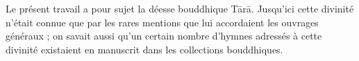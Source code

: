 \documentclass[a4paper, 11pt, oneside, french, landscape, twocolumn]{article}
\begin{document}
\setlength{\parskip}{1mm plus1mm minus1mm}
\clearpage
{}
\onecolumn
\tableofcontents
\clearpage
\twocolumn
{}
\section*{}
\paragraph{}
Le présent travail a pour sujet la déesse bouddhique T\={a}r\={a}. Jusqu'ici cette divinité n'était connue que par les rares mentions que lui accordaient les ouvrages généraux ; on savait aussi qu'un certain nombre d'hymnes adressés à cette divinité existaient en manuscrit dans les collections bouddhiques.
\end{document}
